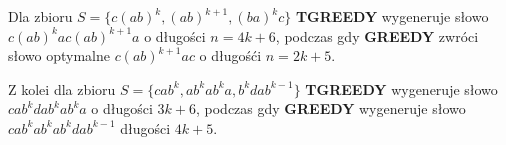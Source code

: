 \documentclass[12pt]{article}
\theoremstyle{definition}
\begin{document}
Dla zbioru $S = \{c(ab)^k, (ab)^{k+1},(ba)^kc\}$ \textbf{TGREEDY} wygeneruje słowo $c(ab)^{k}ac(ab)^{k+1}a$ o długości $n=4k+6$, podczas gdy \textbf{GREEDY} zwróci słowo optymalne
$c(ab)^{k+1}ac$ o długośći $n=2k+5$. 

Z kolei dla zbioru $S = \{cab^k, ab^kab^ka, b^kdab^{k-1} \}$ \textbf{TGREEDY} wygeneruje słowo $cab^kdab^kab^ka$ o długości $3k+6$, podczas gdy 
\textbf{GREEDY} wygeneruje słowo $cab^kab^kab^kdab^{k-1}$ długości $4k+5$.
\end{document}
